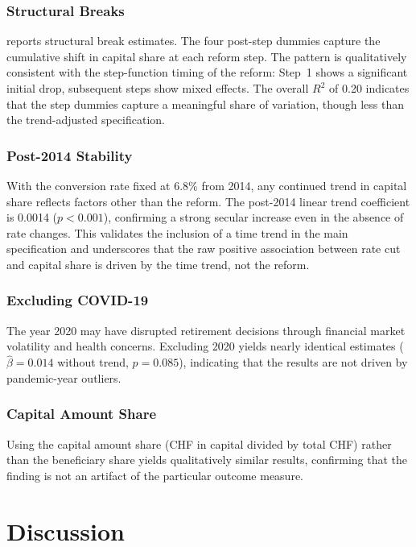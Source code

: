 \documentclass[12pt]{article}
\begin{document}
\subsubsection*{Structural Breaks}  reports structural break estimates. The four post-step dummies capture the cumulative shift in capital share at each reform step. The pattern is qualitatively consistent with the step-function timing of the reform: Step~1 shows a significant initial drop, subsequent steps show mixed effects. The overall $R^2$ of 0.20 indicates that the step dummies capture a meaningful share of variation, though less than the trend-adjusted specification.



\subsubsection*{Post-2014 Stability} With the conversion rate fixed at 6.8\% from 2014, any continued trend in capital share reflects factors other than the reform. The post-2014 linear trend coefficient is 0.0014 ($p < 0.001$), confirming a strong secular increase even in the absence of rate changes. This validates the inclusion of a time trend in the main specification and underscores that the raw positive association between rate cut and capital share is driven by the time trend, not the reform.

\subsubsection*{Excluding COVID-19} The year 2020 may have disrupted retirement decisions through financial market volatility and health concerns. Excluding 2020 yields nearly identical estimates ($\hat{\beta} = 0.014$ without trend, $p = 0.085$), indicating that the results are not driven by pandemic-year outliers.

\subsubsection*{Capital Amount Share} Using the capital amount share (CHF in capital divided by total CHF) rather than the beneficiary share yields qualitatively similar results, confirming that the finding is not an artifact of the particular outcome measure.


\section{Discussion}
\label{sec:discussion}
\end{document}
